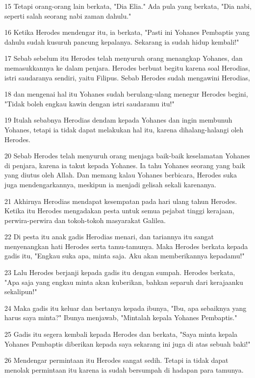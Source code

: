 \par 15 Tetapi orang-orang lain berkata, "Dia Elia." Ada pula yang berkata, "Dia nabi, seperti salah seorang nabi zaman dahulu."
\par 16 Ketika Herodes mendengar itu, ia berkata, "Pasti ini Yohanes Pembaptis yang dahulu sudah kusuruh pancung kepalanya. Sekarang ia sudah hidup kembali!"
\par 17 Sebab sebelum itu Herodes telah menyuruh orang menangkap Yohanes, dan memasukkannya ke dalam penjara. Herodes berbuat begitu karena soal Herodias, istri saudaranya sendiri, yaitu Filipus. Sebab Herodes sudah mengawini Herodias,
\par 18 dan mengenai hal itu Yohanes sudah berulang-ulang menegur Herodes begini, "Tidak boleh engkau kawin dengan istri saudaramu itu!"
\par 19 Itulah sebabnya Herodias dendam kepada Yohanes dan ingin membunuh Yohanes, tetapi ia tidak dapat melakukan hal itu, karena dihalang-halangi oleh Herodes.
\par 20 Sebab Herodes telah menyuruh orang menjaga baik-baik keselamatan Yohanes di penjara, karena ia takut kepada Yohanes. Ia tahu Yohanes seorang yang baik yang diutus oleh Allah. Dan memang kalau Yohanes berbicara, Herodes suka juga mendengarkannya, meskipun ia menjadi gelisah sekali karenanya.
\par 21 Akhirnya Herodias mendapat kesempatan pada hari ulang tahun Herodes. Ketika itu Herodes mengadakan pesta untuk semua pejabat tinggi kerajaan, perwira-perwira dan tokoh-tokoh masyarakat Galilea.
\par 22 Di pesta itu anak gadis Herodias menari, dan tariannya itu sangat menyenangkan hati Herodes serta tamu-tamunya. Maka Herodes berkata kepada gadis itu, "Engkau suka apa, minta saja. Aku akan memberikannya kepadamu!"
\par 23 Lalu Herodes berjanji kepada gadis itu dengan sumpah. Herodes berkata, "Apa saja yang engkau minta akan kuberikan, bahkan separuh dari kerajaanku sekalipun!"
\par 24 Maka gadis itu keluar dan bertanya kepada ibunya, "Ibu, apa sebaiknya yang harus saya minta?" Ibunya menjawab, "Mintalah kepala Yohanes Pembaptis."
\par 25 Gadis itu segera kembali kepada Herodes dan berkata, "Saya minta kepala Yohanes Pembaptis diberikan kepada saya sekarang ini juga di atas sebuah baki!"
\par 26 Mendengar permintaan itu Herodes sangat sedih. Tetapi ia tidak dapat menolak permintaan itu karena ia sudah bersumpah di hadapan para tamunya.
